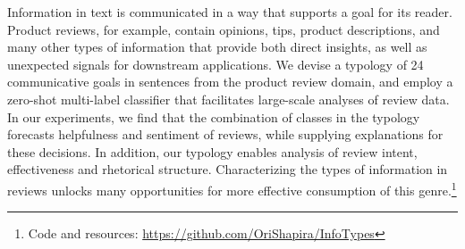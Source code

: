Information in text is communicated in a way that supports a goal for its reader.
Product reviews, for example, contain opinions, tips, product descriptions, and many other types of information that provide both direct insights, as well as unexpected signals for downstream applications.
We devise a typology of 24 communicative goals in sentences from the product review domain, and employ a zero-shot multi-label classifier that facilitates large-scale analyses of review data.
In our experiments, we find that the combination of classes in the typology forecasts helpfulness and sentiment of reviews, while supplying explanations for these decisions.
In addition, our typology enables analysis of review intent, effectiveness and rhetorical structure.
Characterizing the types of information in reviews unlocks many opportunities for more effective consumption of this genre.\footnote{Code and resources: \url{https://github.com/OriShapira/InfoTypes}}

